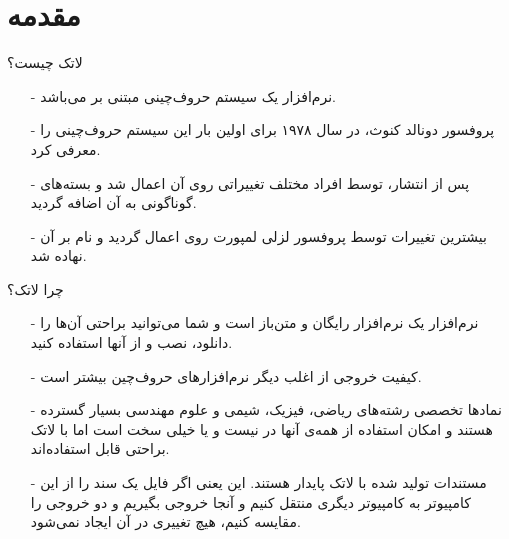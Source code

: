 \section{مقدمه}

\begin{frame}{لاتک چیست؟}
\begin{itemize}\itemr
\item[-]
نرم‌افزار 
\lr{\LaTeX}
یک سیستم حروف‌چینی‌ مبتنی بر 
\lr{\TeX}
می‌باشد.

\item[-]
پروفسور دونالد کنوث، در سال ۱۹۷۸ برای اولین بار این سیستم حروف‌چینی را معرفی کرد.

\item[-]
پس از انتشار، 
\lr{\TeX}
توسط افراد مختلف تغییراتی روی آن اعمال شد و بسته‌‌های گوناگونی به آن اضافه گردید.

\item[-]
بیشترین تغییرات توسط پروفسور لزلی لمپورت روی 
\lr{\TeX}
اعمال گردید و نام 
\lr{\LaTeX}
بر آن نهاده شد.
\end{itemize}
\end{frame}

\begin{frame}{چرا لاتک؟}
\begin{itemize}\itemr
\item[-]
نرم‌افزار
\lr{\LaTeX}
یک نرم‌افزار رایگان و متن‌باز است و شما می‌توانید براحتی آن‌ها را دانلود، نصب و از آنها استفاده کنید.

\item[-]
کیفیت خروجی 
\lr{\LaTeX}
از اغلب دیگر نرم‌افزار‌های حروف‌چین بیشتر است.

\item[-]
نماد‌ها تخصصی رشته‌های ریاضی، فیزیک، شیمی و علوم مهندسی بسیار گسترده هستند و امکان استفاده از همه‌ی آنها در 
نیست و یا خیلی سخت است اما با لاتک براحتی قابل استفاده‌اند.

\item[-]
مستندات تولید شده با لاتک پایدار هستند. این یعنی اگر فایل 
یک سند را از این کامپیوتر به کامپیوتر دیگری منتقل کنیم و آنجا خروجی بگیریم و دو خروجی را مقایسه کنیم، هیچ تغییری در آن ایجاد نمی‌شود.
\end{itemize}
\end{frame}

